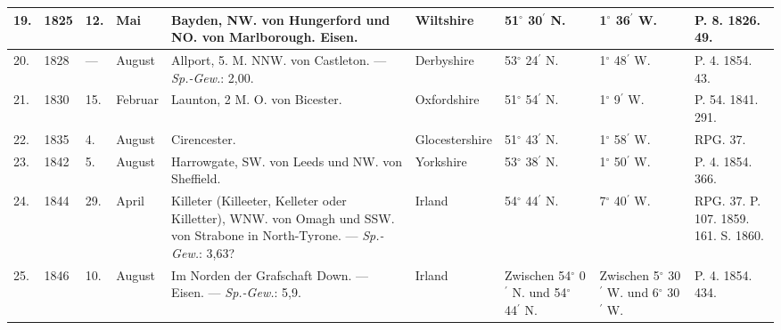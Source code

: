 \documentclass[a4paper, 8pt, oneside, polutonikogreek, german]{article}
\begin{document}
\begin{center}
\begin{longtable}{|p{3mm}|p{10mm}|p{3mm}|p{15mm}|p{30mm}|p{25mm}|p{13mm}|p{13mm}|p{13mm}|}
        19. & 1825 & 12. & Mai & Bayden, NW. von Hungerford und NO. von Marlborough. Eisen. & Wiltshire & 51$^\circ$ 30$^\prime$ N. & 1$^\circ$ 36$^\prime$ W. & P. 8. 1826. 49. \\ \hline
        20. & 1828 & --- & August & Allport, 5. M. NNW. von Castleton. --- \emph{Sp.-Gew.}: 2,00. & Derbyshire & 53$^\circ$ 24$^\prime$ N. & 1$^\circ$ 48$^\prime$ W. & P. 4. 1854. 43. \\ \hline
        21. & 1830 & 15. & Februar & Launton, 2 M. O. von Bicester. & Oxfordshire & 51$^\circ$ 54$^\prime$ N. & 1$^\circ$ 9$^\prime$ W. & P. 54. 1841. 291. \\ \hline
        22. & 1835 & 4. & August & Cirencester. & Glocestershire & 51$^\circ$ 43$^\prime$ N. & 1$^\circ$ 58$^\prime$ W. & RPG. 37. \\ \hline
        23. & 1842 & 5. & August & Harrowgate, SW. von Leeds und NW. von Sheffield. & Yorkshire & 53$^\circ$ 38$^\prime$ N. & 1$^\circ$ 50$^\prime$ W. & P. 4. 1854. 366. \\ \hline
        24. & 1844 & 29. & April & Killeter (Killeeter, Kelleter oder Killetter), WNW. von Omagh und SSW. von Strabone in North-Tyrone. --- \emph{Sp.-Gew.}: 3,63? & Irland & 54$^\circ$ 44$^\prime$ N. & 7$^\circ$ 40$^\prime$ W. & RPG. 37. P. 107. 1859. 161. S. 1860. \\ \hline
        25. & 1846 & 10. & August & Im Norden der Grafschaft Down. --- Eisen. --- \emph{Sp.-Gew.}: 5,9. & Irland & Zwischen 54$^\circ$ 0$^\prime$ N. und 54$^\circ$ 44$^\prime$ N. & Zwischen 5$^\circ$ 30$^\prime$ W. und 6$^\circ$ 30$^\prime$ W. & P. 4. 1854. 434. \\ \hline
    \end{longtable}
\end{center}
\end{document}
